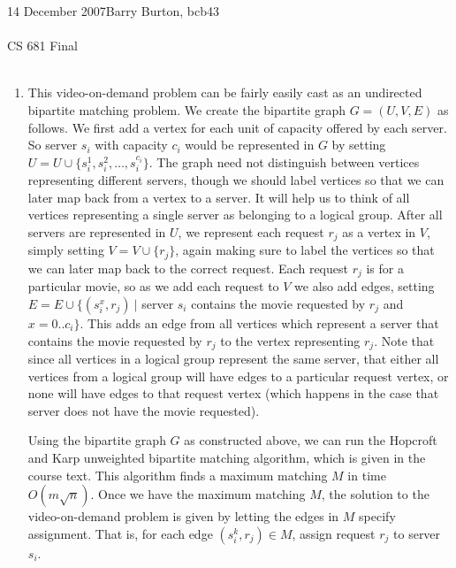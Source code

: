 \documentclass{article}
\begin{document}
\begin{flushleft}
\textsf{14 December 2007}\hfill\textsf{Barry Burton, bcb43}\\
\hrulefill\\
{\large
\textsf{CS 681 \hfill Final}}\\
\hrulefill\\
\end{flushleft}

\begin{enumerate}
\item This video-on-demand problem can be fairly easily cast as an undirected bipartite matching problem.  We create the bipartite graph $G = (U,V,E)$ as follows. We first add a vertex for each unit of capacity offered by each server. So server $s_i$ with capacity $c_i$ would be represented in $G$ by setting $U = U \cup \{ s_i^1, s_i^2, \ldots, s_i^{c_i} \}$. The graph need not distinguish between vertices representing different servers, though we should label vertices so that we can later map back from a vertex to a server. It will help us to think of all vertices representing a single server as belonging to a logical group. After all servers are represented in $U$, we represent each request $r_j$ as a vertex in $V$, simply setting $V = V \cup \{ r_j \}$, again making sure to label the vertices so that we can later map back to the correct request. Each request $r_j$ is for a particular movie, so as we add each request to $V$ we also add edges, setting $E = E \cup \{ (s_i^x, r_j) ~|$ server $s_i$ contains the movie requested by $r_j$ and $x = 0..c_i \}$. This adds an edge from all vertices which represent a server that contains the movie requested by $r_j$ to the vertex representing $r_j$. Note that since all vertices in a logical group represent the same server, that either all vertices from a logical group will have edges to a particular request vertex, or none will have edges to that request vertex (which happens in the case that server does not have the movie requested).

\par Using the bipartite graph $G$ as constructed above, we can run the Hopcroft and Karp unweighted bipartite matching algorithm, which is given in the course text. This algorithm finds a maximum matching $M$ in time $O( m \sqrt{n} )$.
Once we have the maximum matching $M$, the solution to the video-on-demand problem is given by letting the edges in $M$ specify assignment. That is, for each edge $(s_i^k, r_j) \in M$, assign request $r_j$ to server $s_i$.


\end{enumerate}
\end{document}
